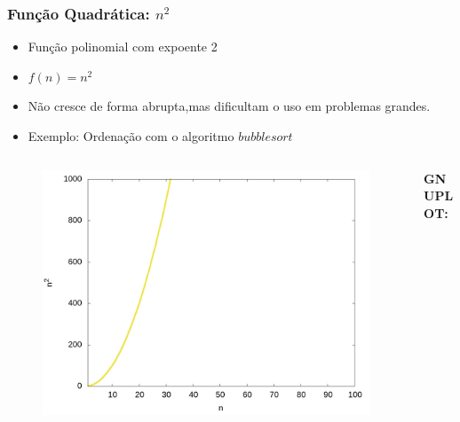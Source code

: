 \documentclass[aspectratio=169]{beamer}
\begin{document}
\begin{frame}\frametitle{Função Quadrática: $n^2$}
\begin{itemize}
	\item Função polinomial com expoente 2
	\item $f(n) = n^2$
	\item Não cresce de forma abrupta,mas dificultam o uso em problemas grandes.
	\item Exemplo: Ordenação com o algoritmo $bubblesort$
\end{itemize}
\vspace{-5mm}
\begin{columns}[T]
\begin{column}{0.6\linewidth}
\begin{figure}[h]
	\centering
	\includegraphics[height=0.5\paperheight]{graficos/n^2.jpg}
\end{figure}
\end{column}
\begin{column}{0.4\linewidth}
\vspace{5mm}
{\fontsize{0}{4}\selectfont{}\textbf{GNUPLOT:}

}
\end{column}
\end{columns}
\end{frame}
\end{document}
